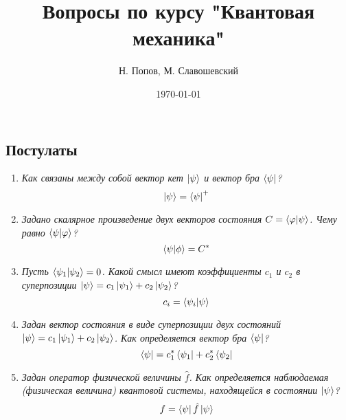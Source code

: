\documentclass{article}
\begin{document}
\title{Вопросы по курсу "Квантовая механика"}
\author{Н. Попов, М. Славошевский}
\date{\today}
\maketitle

\subsection*{Постулаты}
	\begin{enumerate}
		\item \textit{Как связаны между собой вектор кет $\ket{\psi}$ и вектор бра $\bra{\psi} $?}
		\begin{equation}
			\ket{\psi}=\bra{\psi}^{+}
		\end{equation}	
	\item \textit{Задано скалярное произведение двух векторов состояния $C =\braket{\varphi | \psi}$. Чему равно $\braket{\psi | \varphi}$?}
	\begin{equation}
		\braket{\psi|\phi}=C^{*}
	\end{equation}
	
	\item \textit{Пусть $\braket{\psi_1 | \psi_2} = 0$. Какой смысл имеют коэффициенты $c_1$ и $c_2$ в суперпозиции $\ket{\psi} = c_1 \ket{\psi_1} + c_2 \ket{\psi_2} $?}
	\begin{equation}
		c_{i}=\braket{\psi_{i}|\psi}
	\end{equation}
	\item \textit{Задан вектор состояния в виде суперпозиции двух состояний $\ket{\psi} = c_1 \ket{\psi_1} + c_2 \ket{\psi_2}$. Как
определяется вектор бра $\bra{\psi}$?}
	\begin{equation}
		\bra{\psi}=c_{1}^{*}\bra{\psi_{1}}+c_{2}^{*}\bra{\psi_{2}}
	\end{equation}
	\item \textit{Задан оператор физической величины $\hat{f}$. Как определяется наблюдаемая (физическая величина) квантовой системы, находящейся в состоянии $\ket{\psi}$?
}	
	\begin{equation}
		f=\bra{\psi}\hat{f}\ket{\psi}
	\end{equation}
	
	\end{enumerate}
\end{document}
